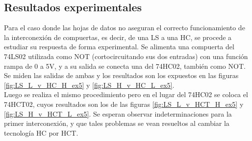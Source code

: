 \subsection{Resultados experimentales}
Para el caso donde las hojas de datos no aseguran el correcto funcionamiento de la interconexión de compuertas, es decir, de una LS a una HC, se procede a estudiar su 
respuesta de forma experimental.
Se alimenta una compuerta del 74LS02 utilizada como NOT (cortocircuitando sus dos entradas) con una función rampa de 0 a 5V, y a su salida se conecta una del 74HC02, 
también como NOT. 
Se miden las salidas de ambas y los resultados son los expuestos en las figuras \ref{fig:LS_L_v_HC_H_ex5} y \ref{fig:LS_H_v_HC_L_ex5}.\\
Luego se realiza el mismo procedimiento pero en el lugar del 74HC02 se coloca el 74HCT02, cuyos resultados son los de las figuras \ref{fig:LS_L_v_HCT_H_ex5} y \ref{fig:LS_H_v_HCT_L_ex5}.
Se esperan observar indeterminaciones para la primer interconexión, y que tales problemas se vean resueltos al cambiar la tecnología HC por HCT. 


